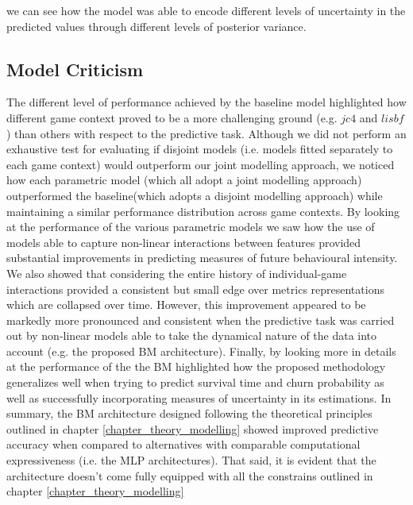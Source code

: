 we can see how the model was able to encode different levels of uncertainty in the predicted values through different levels of posterior variance.


\subsection{Model Criticism}
\label{model_criticims_1}
The different level of performance achieved by the baseline model highlighted how different game context proved to be a more challenging ground (e.g. $jc4$ and $lisbf$) than others with respect to the predictive task. Although we did not perform an exhaustive test for evaluating if disjoint models (i.e. models fitted separately to each game context) would outperform our joint modelling approach, we noticed how each parametric model (which all adopt a joint modelling approach) outperformed the baseline(which adopts a disjoint modelling approach) while maintaining a similar performance distribution across game contexts. By looking at the performance of the various parametric models we saw how  the use of models able to capture non-linear interactions between features provided substantial improvements in predicting measures of future behavioural intensity. We also showed that considering the entire history of individual-game interactions provided a consistent but small edge over metrics representations which are collapsed over time. However, this improvement appeared to be markedly more pronounced and consistent when the predictive task was carried out by non-linear models able to take the dynamical nature of the data into account (e.g. the proposed BM architecture). Finally, by looking more in details at the performance of the the BM highlighted how the proposed methodology generalizes well when trying to predict survival time and churn probability as well as successfully incorporating measures of uncertainty in its estimations. In summary, the BM architecture designed following the theoretical principles outlined in chapter \ref{chapter_theory_modelling} showed improved predictive accuracy when compared to alternatives with comparable computational expressiveness (i.e. the MLP architectures). That said, it is evident that the architecture doesn't come fully equipped with all the constrains outlined in chapter \ref{chapter_theory_modelling}
